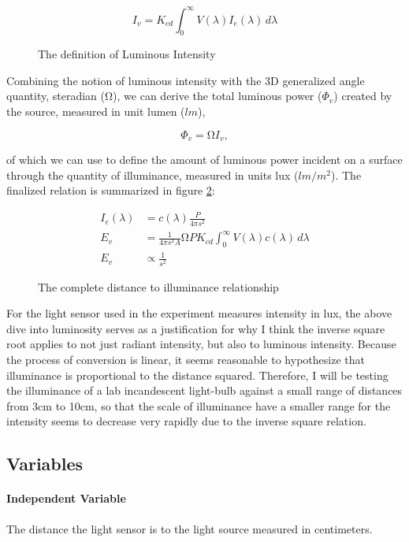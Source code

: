 \documentclass[a4paper,12pt]{article}
\begin{document}
\begin{figure}[h!]
    \[
     I_v = K_{cd} \int_{0}^{\infty} V(\lambda) I_e(\lambda) \, d\lambda
    \]
    \caption{The definition of Luminous Intensity}
    \label{eq:li}
\end{figure}

Combining the notion of luminous intensity with the 3D generalized angle quantity, steradian ($\si{\ohm}$), we can derive the total luminous power ($\Phi_v$) created by the source, measured in unit lumen ($\si{lm}$),

\[
    \Phi_v = \si{\ohm} I_v,
\]

of which we can use to define the amount of luminous power incident on a surface through the quantity of illuminance, measured in units lux ($\si{lm\per m^2}$). The finalized relation is summarized in figure \ref{eq:dti}:

\begin{figure}[h!]
 \centering
 \begin{align*}
 I_e(\lambda) &= c(\lambda) \frac{P}{4\pi s^2}\\
  E_v &= \frac{1}{4\pi s^2 A} \si{\ohm} P K_{cd} \int_{0}^{\infty} V(\lambda) c(\lambda) \, d\lambda\\
  E_v & \propto \frac{1}{s^2}
 \end{align*}
 \caption{The complete distance to illuminance relationship}
 \label{eq:dti}
\end{figure}


For the light sensor used in the experiment measures intensity in lux, the above dive into luminosity serves as a justification for why I think the inverse square root applies to not just radiant intensity, but also to luminous intensity. Because the process of conversion is linear, it seems reasonable to hypothesize that illuminance is proportional to the distance squared. Therefore, I will be testing the illuminance of a lab incandescent light-bulb against a small range of distances from 3cm to 10cm, so that the scale of illuminance have a smaller range for the intensity seems to decrease very rapidly due to the inverse square relation.


\subsection{Variables}
\paragraph{Independent Variable}
The distance the light sensor is to the light source measured in centimeters.
\end{document}
